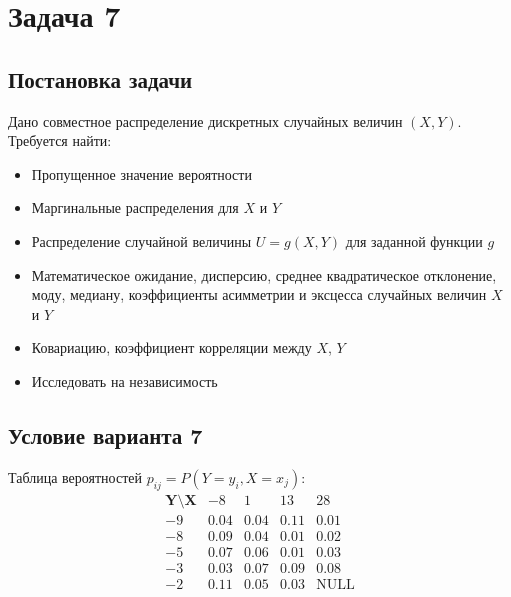 \documentclass[a4paper,14pt]{extarticle}
\begin{document}
            
    
    
    \section*{Задача 7}
        
        \subsection*{Постановка задачи}
            Дано совместное распределение дискретных случайных величин $(X, Y )$. Требуется найти:
            \begin{itemize}
                \item Пропущенное значение вероятности
                \item Маргинальные распределения для $X$ и $Y$
                \item Распределение случайной величины $U = g(X, Y)$ для заданной функции $g$
                \item Математическое ожидание, дисперсию, среднее квадратическое отклонение, моду, медиану, коэффициенты асимметрии и эксцесса случайных величин $X$ и $Y$
                \item Ковариацию, коэффициент корреляции между $X$, $Y$
                \item Исследовать на независимость
            \end{itemize}
        
        \subsection*{Условие варианта 7}
            Таблица вероятностей $p_{ij} = P(Y=y_i, X=x_j)$:
            \[
                \begin{array}{c|cccc}
                    \mathbf{Y \setminus X} & -8 & 1 & 13 & 28 \\
                    \hline
                    -9 & 0.04 & 0.04 & 0.11 & 0.01  \\
                    -8 & 0.09 & 0.04 & 0.01 & 0.02  \\
                    -5 & 0.07 & 0.06 & 0.01 & 0.03  \\
                    -3 & 0.03 & 0.07 & 0.09 & 0.08  \\
                    -2 & 0.11 & 0.05 & 0.03 & \text{NULL}  \\
                \end{array}
            \]
        
\end{document}
